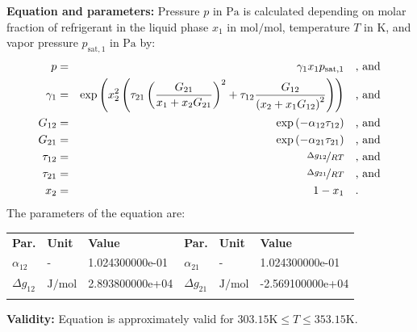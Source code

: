 \textbf{Equation and parameters:}
\newline
%
Pressure $p$ in $\si{\pascal}$ is calculated depending on molar fraction of refrigerant in the liquid phase $x_1$ in $\si{\mole\per\mole}$, temperature $T$ in $\si{\kelvin}$, and vapor pressure $p_\mathrm{sat,1}$ in $\si{\pascal}$ by:
%
\begin{equation*}
\begin{split}
p &=& \gamma_1 x_1 p_\mathrm{sat,1} & \quad\text{, and} \\
\gamma_1 &=& \exp \left( x_2^2 \left( \tau_{21} \left( \frac{G_{21}}{x_1 + x_2 G_{21}} \right) ^2 + \tau_{12} \frac{G_{12}}{\left( x_2 + x_1 G_{12} \right) ^2}\right) \right) & \quad\text{, and} \\
G_{12} &=& \exp \left( -\alpha_{12} \tau_{12} \right) & \quad\text{, and} \\
G_{21} &=& \exp \left( -\alpha_{21} \tau_{21} \right) & \quad\text{, and} \\
\tau_{12} &=& \nicefrac{\Delta g_{12}}{R T} & \quad\text{, and} \\
\tau_{21} &=& \nicefrac{\Delta g_{21}}{R T} & \quad\text{, and} \\
x_2 &=& 1 - x_1  & \quad\text{.} \\
\end{split}
\end{equation*}
%
The parameters of the equation are:
%
\begin{longtable}[l]{lll|lll}
\toprule
\addlinespace
\textbf{Par.} & \textbf{Unit} & \textbf{Value} &	\textbf{Par.} & \textbf{Unit} & \textbf{Value} \\
\addlinespace
\midrule
\endhead

\bottomrule
\endfoot
\bottomrule
\endlastfoot
\addlinespace

$\alpha_{12}$ & - & 1.024300000e-01 & $\alpha_{21}$ & - & 1.024300000e-01 \\
$\Delta g_{12}$ & $\si{\joule\per\mole}$ & 2.893800000e+04 & $\Delta g_{21}$ & $\si{\joule\per\mole}$ & -2.569100000e+04 \\

\addlinespace\end{longtable}

\textbf{Validity:}
\newline
Equation is approximately valid for $303.15 \si{\kelvin} \leq T \leq 353.15 \si{\kelvin}$.
\newline

